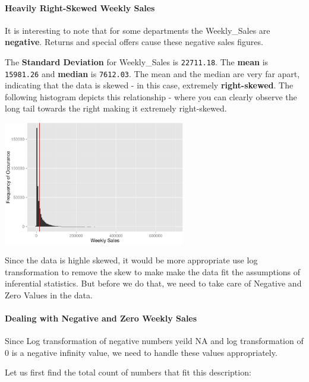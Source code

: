 \documentclass[]{article}
\newenvironment{Shaded}{\begin{snugshade}}{\end{snugshade}}
\newcommand{\KeywordTok}[1]{\textcolor[rgb]{0.13,0.29,0.53}{\textbf{{#1}}}}
\newcommand{\DecValTok}[1]{\textcolor[rgb]{0.00,0.00,0.81}{{#1}}}
\newcommand{\StringTok}[1]{\textcolor[rgb]{0.31,0.60,0.02}{{#1}}}
\newcommand{\NormalTok}[1]{{#1}}
\begin{document}
\paragraph{Heavily Right-Skewed Weekly
Sales}\label{heavily-right-skewed-weekly-sales}

It is interesting to note that for some departments the Weekly\_Sales
are \textbf{negative}. Returns and special offers cause these negative
sales figures.

The \textbf{Standard Deviation} for Weekly\_Sales is \texttt{22711.18}.
The \textbf{mean} is \texttt{15981.26} and \textbf{median} is
\texttt{7612.03}. The mean and the median are very far apart, indicating
that the data is skewed - in this case, extremely \textbf{right-skewed}.
The following histogram depicts this relationship - where you can
clearly observe the long tail towards the right making it extremely
right-skewed.

\includegraphics[width=300px]{PredictingWeeklySalesAtWalmart_files/figure-latex/weeklySalesSkew-1}

Since the data is highle skewed, it would be more appropriate use log
transformation to remove the skew to make make the data fit the
assumptions of inferential statistics. But before we do that, we need to
take care of Negative and Zero Values in the data.

\paragraph{Dealing with Negative and Zero Weekly
Sales}\label{dealing-with-negative-and-zero-weekly-sales}

Since Log transformation of negative numbers yeild NA and log
transformation of 0 is a negative infinity value, we need to handle
these values appropriately.

Let us first find the total count of numbers that fit this description:

\begin{Shaded}
\end{Shaded}
\end{document}
